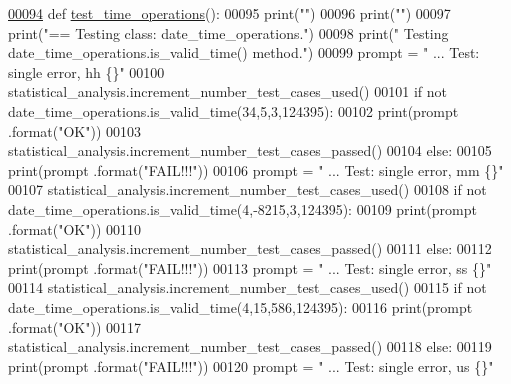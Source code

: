 \begin{DoxyCode}
\hypertarget{classutilities_1_1date__time__processing__tester_1_1date__time__operations__tester_l00094}{}\hyperlink{classutilities_1_1date__time__processing__tester_1_1date__time__operations__tester_a024182086c48b718cc794b100501eb79}{00094}     \textcolor{keyword}{def }\hyperlink{classutilities_1_1date__time__processing__tester_1_1date__time__operations__tester_a024182086c48b718cc794b100501eb79}{test\_time\_operations}():
00095         print(\textcolor{stringliteral}{""})
00096         print(\textcolor{stringliteral}{""})
00097         print(\textcolor{stringliteral}{"==   Testing class: date\_time\_operations."})
00098         print(\textcolor{stringliteral}{" Testing date\_time\_operations.is\_valid\_time() method."})
00099         prompt = \textcolor{stringliteral}{"  ... Test: single error, hh              \{\}"}
00100         statistical\_analysis.increment\_number\_test\_cases\_used()
00101         \textcolor{keywordflow}{if} \textcolor{keywordflow}{not} date\_time\_operations.is\_valid\_time(34,5,3,124395):
00102             print(prompt .format(\textcolor{stringliteral}{"OK"}))
00103             statistical\_analysis.increment\_number\_test\_cases\_passed()
00104         \textcolor{keywordflow}{else}:
00105             print(prompt .format(\textcolor{stringliteral}{"FAIL!!!"}))
00106         prompt = \textcolor{stringliteral}{"  ... Test: single error, mm              \{\}"}
00107         statistical\_analysis.increment\_number\_test\_cases\_used()
00108         \textcolor{keywordflow}{if} \textcolor{keywordflow}{not} date\_time\_operations.is\_valid\_time(4,-8215,3,124395):
00109             print(prompt .format(\textcolor{stringliteral}{"OK"}))
00110             statistical\_analysis.increment\_number\_test\_cases\_passed()
00111         \textcolor{keywordflow}{else}:
00112             print(prompt .format(\textcolor{stringliteral}{"FAIL!!!"}))
00113         prompt = \textcolor{stringliteral}{"  ... Test: single error, ss              \{\}"}
00114         statistical\_analysis.increment\_number\_test\_cases\_used()
00115         \textcolor{keywordflow}{if} \textcolor{keywordflow}{not} date\_time\_operations.is\_valid\_time(4,15,586,124395):
00116             print(prompt .format(\textcolor{stringliteral}{"OK"}))
00117             statistical\_analysis.increment\_number\_test\_cases\_passed()
00118         \textcolor{keywordflow}{else}:
00119             print(prompt .format(\textcolor{stringliteral}{"FAIL!!!"}))
00120         prompt = \textcolor{stringliteral}{"  ... Test: single error, us              \{\}"}

\end{DoxyCode}
